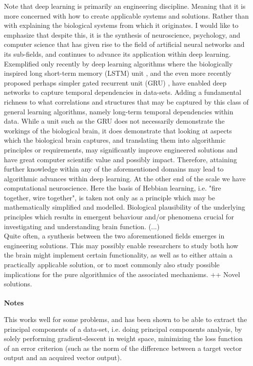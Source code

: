 Note that deep learning is primarily an engineering discipline. Meaning that it is more concerned with how to create applicable systems and solutions. Rather than with explaining the biological systems from which it originates. I would like to emphasize that despite this, it is the synthesis of neuroscience, psychology, and computer science that has given rise to the field of artificial neural networks and its sub-fields, and continues to advance its application within deep learning. Exemplified only recently by deep learning algorithms where the biologically inspired long short-term memory (LSTM) unit \citep{Hochreiter1997}, and the even more recently proposed perhaps simpler gated recurrent unit (GRU) \citep{Mnih2015}, have enabled deep networks to capture temporal dependencies in data-sets. Adding a fundamental richness to what correlations and structures that may be captured by this class of general learning algorithms, namely long-term temporal dependencies within data. While a unit such as the GRU does not necessarily demonstrate the workings of the biological brain, it does demonstrate that looking at aspects which the biological brain captures, and translating them into algorithmic principles or requirements, may significantly improve engineered solutions and have great computer scientific value and possibly impact. Therefore, attaining further knowledge within any of the aforementioned domains may lead to algorithmic advances within deep learning. 
At the other end of the scale we have computational neuroscience. Here the basis of Hebbian learning, i.e. "fire together, wire together", is taken not only as a principle which may be mathematically simplified and modelled. Biological plausibility of the underlying principles which results in emergent behaviour and/or phenomena crucial for investigating and understanding brain function. (...)
\\

Quite often, a synthesis between the two aforementioned fields emerges in engineering solutions. This may possibly enable researchers to study both how the brain might implement certain functionality, as well as to either attain a practically applicable solution, or to most commonly also study possible implications for the pure algorithmics of the associated mechanisms.
++ Novel solutions.
\\\\


\textbf{Notes}

This works well for some problems, and has been shown to be able to extract the principal components of a data-set, i.e. doing principal components analysis, by solely performing gradient-descent in weight space, minimizing the loss function of an error criterion (such as the norm of the difference between a target vector output and an acquired vector output).

